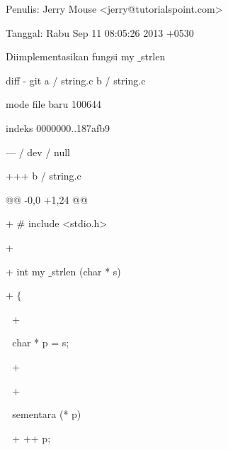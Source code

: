 \noindent 
 \hspace*{0.5in} Penulis: Jerry Mouse <jerry@tutorialspoint.com> \par
\noindent 
 \hspace*{0.5in} Tanggal: Rabu Sep 11 08:05:26 2013 +0530 \par
\noindent 
 \hspace*{0.5in} Diimplementasikan fungsi my $  \_  $strlen \par
\noindent 
 \hspace*{0.5in} diff - git a / string.c b / string.c \par
\noindent 
 \hspace*{0.5in} mode file baru 100644 \par
\noindent 
 \hspace*{0.5in} indeks 0000000..187afb9 \par
\noindent 
 \hspace*{0.5in} --- / dev / null \par
\noindent 
 \hspace*{0.5in} +++ b / string.c \par
\noindent 
 \hspace*{0.5in} @@ -0,0 +1,24 @@ \par
\noindent 
 \hspace*{0.5in} +  $  \#  $ include <stdio.h> \par
\noindent 
 \hspace*{0.5in} + \par
\noindent 
 \hspace*{0.5in} + int my $  \_  $strlen (char * s) \par
\noindent 
 \hspace*{0.5in} +  $  \{  $ \par
\noindent 
 \hspace*{0.5in}  $  $ $  $ $  $+ \par
\noindent 
 \hspace*{0.5in}  $  $ $  $ $  $char * p = s; \par
\noindent 
 \hspace*{0.5in}  $  $ $  $ $  $+ \par
\noindent 
 \hspace*{0.5in}  $  $ $  $ $  $+ \par
\noindent 
 \hspace*{0.5in}  $  $ $  $ $  $sementara (* p) \par
\noindent 
 \hspace*{0.5in}  $  $ $  $ $  $+ ++ p; \par

